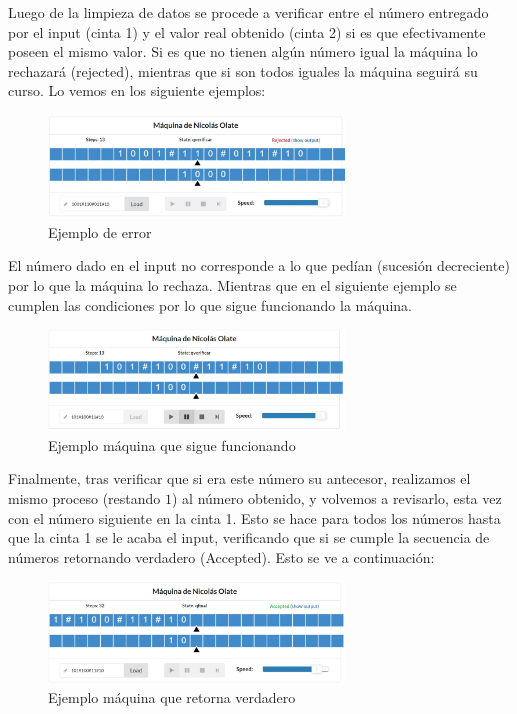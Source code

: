 \documentclass[12pt]{article}
\begin{document}
\begin{enumerate}
    Luego de la limpieza de datos se procede a verificar entre el número entregado por el input (cinta 1) y el valor real obtenido (cinta 2) si es que efectivamente poseen el mismo valor. Si es que no tienen algún número igual la máquina lo rechazará (rejected), mientras que si son todos iguales la máquina seguirá su curso. Lo vemos en los siguiente ejemplos:
     \begin{figure}[h]
        \includegraphics[width=0.7\textwidth]{imagenes/PASO 3.2.JPG}
        \centering
        \caption{Ejemplo de error}
        \label{fig:paso 3.2.1}
    \end{figure}
    \newpage
    El número dado en el input no corresponde a lo que pedían (sucesión decreciente) por lo que la máquina lo rechaza. Mientras que en el siguiente ejemplo se cumplen las condiciones por lo que sigue funcionando la máquina.
    
    \begin{figure}[h]
        \includegraphics[width=0.7\textwidth]{imagenes/PASO 3.2.2.JPG}
        \centering
        \caption{Ejemplo máquina que sigue funcionando}
        \label{fig:paso 3.2.2}
    \end{figure}
    Finalmente, tras verificar que si era este número su antecesor, realizamos el mismo proceso (restando $1$) al número obtenido, y volvemos a revisarlo, esta vez con el número siguiente en la cinta 1. Esto se hace para todos los números hasta que la cinta 1 se le acaba el input, verificando que si se cumple la secuencia de números retornando verdadero (Accepted). Esto se ve a continuación:
    \begin{figure}[h]
        \includegraphics[width=0.7\textwidth]{imagenes/PASO 3.3.JPG}
        \centering
        \caption{Ejemplo máquina que retorna verdadero}
        \label{fig:paso 3.3}
    \end{figure}
\end{enumerate}
\end{document}
